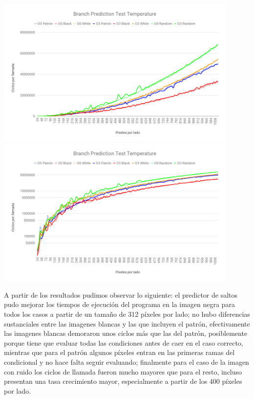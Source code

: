 \begin{center}

	\includegraphics[width=0.9\textwidth]{imagenes/branchprediction/branchpredictionLIN.png} \\
	\includegraphics[width=0.9\textwidth]{imagenes/branchprediction/branchpredictionLOG.png}

\end{center}

A partir de los resultados pudimos observar lo siguiente: el predictor de saltos pudo mejorar los tiempos de ejecución del programa en la imagen negra para todos los casos a partir de un tamaño de 312 píxeles por lado; no hubo diferencias sustanciales entre las imagenes blancas y las que incluyen el patrón, efectivamente las imagenes blancas demoraron unos ciclos más que las del patrón, posiblemente porque tiene que evaluar todas las condiciones antes de caer en el caso correcto, mientras que para el patrón algunos píxeles entran en las primeras ramas del condicional y no hace falta seguir evaluando; finalmente para el caso de la imagen con ruido los ciclos de llamada fueron mucho mayores que para el resto, incluso presentan una tasa crecimiento mayor, especialmente a partir de los 400 píxeles por lado.

